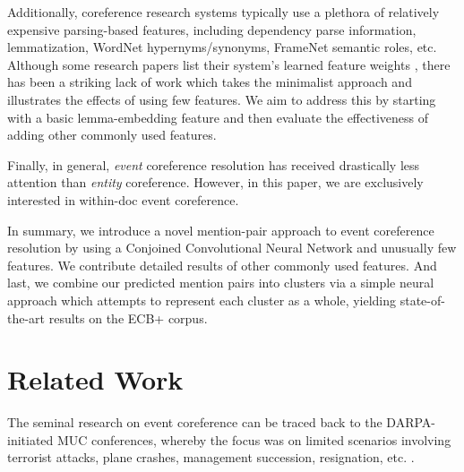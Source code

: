 \documentclass[11pt,a4paper]{article}
\begin{document}
Additionally, coreference research systems typically use a plethora of relatively expensive parsing-based features, including dependency parse information, lemmatization, WordNet hypernyms/synonyms, FrameNet semantic roles, etc.  Although some research papers list their system's learned feature weights \cite{journals/tacl/YangCF15}, there has been a striking lack of work which takes the minimalist approach and illustrates the effects of using few features.  We aim to address this by starting with a basic lemma-embedding feature and then evaluate the effectiveness of adding other commonly used features.

Finally, in general, \textit{event} coreference resolution has received drastically less attention than \textit{entity} coreference.  However, in this paper, we are exclusively interested in within-doc event coreference.

In summary, we introduce a novel mention-pair approach to event coreference resolution by using a Conjoined Convolutional Neural Network and unusually few features.  We contribute detailed results of other commonly used features.  And last, we combine our predicted mention pairs into clusters via a simple neural approach which attempts to represent each cluster as a whole, yielding state-of-the-art results on the ECB+ corpus.



\section{Related Work}
The seminal research on event coreference can be traced back to the DARPA-initiated MUC conferences, whereby the focus was on limited scenarios involving terrorist attacks, plane crashes, management succession, resignation, etc. \cite{Humphreys:1997,Bagga:1999:CEC:1608810.1608812}.


\end{document}
